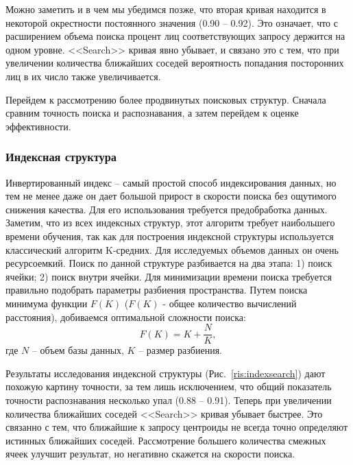 Можно заметить и в чем мы убедимся позже, что вторая кривая находится в некоторой окрестности постоянного значения (0.90 -- 0.92). Это означает, что с расширением объема поиска процент лиц соответствующих запросу держится на одном уровне. <<Search>> кривая явно убывает, и связано это с тем, что при увеличении количества ближайших соседей вероятность попадания посторонних лиц в их число также увеличивается.

Перейдем к рассмотрению более продвинутых поисковых структур. Сначала сравним точность поиска и распознавания, а затем перейдем к оценке эффективности.

\subsubsection{Индексная структура}

Инвертированный индекс -- самый простой способ индексирования данных, но тем не менее даже он дает большой прирост в скорости поиска без ощутимого снижения качества. Для его использования требуется предобработка данных. Заметим, что из всех индексных структур, этот алгоритм требует наибольшего времени обучения, так как для построения индексной структуры используется классический алгоритм K-средних. Для исследуемых объемов данных он очень ресурсоемкий. Поиск по данной структуре разбивается на два этапа: 1) поиск ячейки; 2) поиск внутри ячейки. Для минимизации времени поиска требуется правильно подобрать параметры разбиения пространства. Путем поиска минимума функции $F(K)$ ($F(K)$ - общее количество вычислений расстояния), добиваемся оптимальной сложности поиска:
\begin{equation}\label{eq:index}
F(K)=K + \frac{N}{K},
\end{equation}
где $N$ -- объем базы данных, $K$ -- размер разбиения. 

Результаты исследования индексной структуры (Рис.~\ref{ris:indexsearch}) дают похожую картину точности, за тем лишь исключением, что общий показатель точности распознавания несколько упал (0.88 -- 0.91). Теперь при увеличении количества ближайших соседей <<Search>> кривая убывает быстрее. Это связанно с тем, что ближайшие к запросу центроиды не всегда точно определяют истинных ближайших соседей. Рассмотрение большего количества смежных ячеек улучшит результат, но негативно скажется на скорости поиска.

